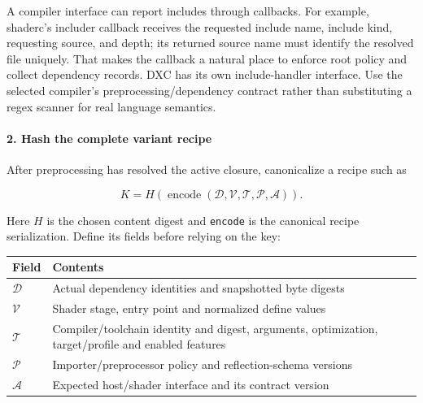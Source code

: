 A compiler interface can report includes through callbacks. For example, shaderc's includer callback receives the requested include name, include kind, requesting source, and depth; its returned source name must identify the resolved file uniquely. That makes the callback a natural place to enforce root policy and collect dependency records. DXC has its own include-handler interface. Use the selected compiler's preprocessing/dependency contract rather than substituting a regex scanner for real language semantics.

\paragraph{2. Hash the complete variant recipe}\label{hash-the-complete-variant-recipe}

After preprocessing has resolved the active closure, canonicalize a recipe such as

\[
K=H(\operatorname{encode}(\mathcal D,\mathcal V,\mathcal T,\mathcal P,\mathcal A)).
\]

Here \(H\) is the chosen content digest and \texttt{encode} is the canonical recipe serialization. Define its fields before relying on the key:

{\def\LTcaptype{none} %
\begin{longtable}[]{@{}
  >{\raggedright\arraybackslash}p{}
  >{\raggedright\arraybackslash}p{}@{}}
\toprule\noalign{}
\begin{minipage}[b]{\linewidth}\raggedright
Field
\end{minipage} & \begin{minipage}[b]{\linewidth}\raggedright
Contents
\end{minipage} \\
\midrule\noalign{}
\endhead
\bottomrule\noalign{}
\endlastfoot
\(\mathcal D\) & Actual dependency identities and snapshotted byte digests \\
\(\mathcal V\) & Shader stage, entry point and normalized define values \\
\(\mathcal T\) & Compiler/toolchain identity and digest, arguments, optimization, target/profile and enabled features \\
\(\mathcal P\) & Importer/preprocessor policy and reflection-schema versions \\
\(\mathcal A\) & Expected host/shader interface and its contract version \\
\end{longtable}
}

